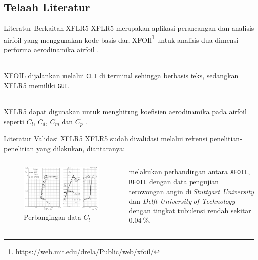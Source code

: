 \subsection{Telaah Literatur}

\begin{frame}{Literatur Berkaitan XFLR5}
  XFLR5 merupakan aplikasi perancangan dan analisis airfoil yang menggunakan kode basis dari XFOIl\footnote{\url{https://web.mit.edu/drela/Public/web/xfoil/}} untuk analisis dua dimensi performa aerodinamika airfoil \cite{guzelbey2018numerical}.\\~\\

  \pause

  XFOIL dijalankan melalui \texttt{CLI} di terminal sehingga berbasis teks, sedangkan XFLR5 memiliki \texttt{GUI}.\\~\\

  \pause

  XFLR5 dapat digunakan untuk menghitung koefisien aerodinamika pada airfoil seperti $C_l$, $C_d$, $C_m$ dan $C_p$ \cite{Deperrois2009}.
\end{frame}

\begin{frame}{Literatur Validasi XFLR5}
  XFLR5 sudah divalidasi melalui refrensi penelitian-penelitian yang dilakukan, diantaranya:
  \pause

  \begin{columns}[t]
    \begin{column}{.5\linewidth}
      \begin{figure}[h]
        \centering
        \includegraphics[width=0.8\linewidth]{statics/compar_airfoil1}
        \caption{Perbangingan data $C_l$}
        \label{fig:comparairfoil1}
      \end{figure}
    \end{column}

    \begin{column}{.5\linewidth}
      \begin{block}{}
        \cite{lasauskas2009analysis} melakukan perbandingan antara \texttt{XFOIL}, \texttt{RFOIL} dengan data pengujian terowongan angin di \textit{Stuttgart University} dan \textit{Delft University of Technology} dengan tingkat tubulensi rendah sekitar $0.04\:\%$.
      \end{block}
    \end{column}
  \end{columns}
\end{frame}

